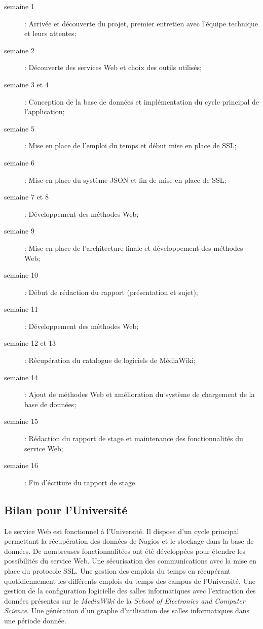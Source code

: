 \begin{description}
	\item[semaine 1] : Arriv\'ee et d\'ecouverte du projet, premier entretien avec l'\'equipe technique et leurs attentes;
	\item[semaine 2] : D\'ecouverte des services Web et choix des outils utilis\'es;
	\item[semaine 3 et 4] : Conception de la base de donn\'ees et impl\'ementation du cycle principal de l'application;
	\item[semaine 5] : Mise en place de l'emploi du temps et d\'ebut mise en place de SSL;
	\item[semaine 6] : Mise en place du syst\`eme JSON et fin de mise en place de SSL;
	\item[semaine 7 et 8] : D\'eveloppement des m\'ethodes Web;
	\item[semaine 9] : Mise en place de l'architecture finale et d\'eveloppement des m\'ethodes Web;
	\item[semaine 10] : D\'ebut de r\'edaction du rapport (pr\'esentation et sujet);
	\item[semaine 11] : D\'eveloppement des m\'ethodes Web;
	\item[semaine 12 et 13] : R\'ecup\'eration du catalogue de logiciels de M\'ediaWiki;
	\item[semaine 14] : Ajout de m\'ethodes Web et am\'elioration du syst\`eme de chargement de la base de donn\'ees;
	\item[semaine 15] : R\'edaction du rapport de stage et maintenance des fonctionnalit\'es du service Web;
	\item[semaine 16] : Fin d'\'ecriture du rapport de stage.

\end{description}

\subsection{Bilan pour l'Universit\'e}

Le service Web est fonctionnel \`a l'Universit\'e.
Il dispose d'un cycle principal permettant la r\'ecup\'eration des donn\'ees de Nagios et le stockage dans la base de donn\'ees.
De nombreuses fonctionnalit\'ees ont \'et\'e d\'evelopp\'ees pour \'etendre les possibilit\'es du service Web.
Une s\'ecurisation des communications avec la mise en place du protocole SSL.
Une gestion des emplois du temps en r\'ecup\'erant quotidiennement les diff\'erents emplois du temps des campus de l'Universit\'e.
Une gestion de la configuration logicielle des salles informatiques avec l'extraction des donn\'ees pr\'esentes sur le \textit{MediaWiki} de la \textit{School of Electronics and Computer Science}.
Une g\'en\'eration d'un graphe d'utilisation des salles informatiques dans une p\'eriode donn\'ee.

